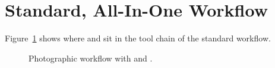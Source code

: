 

\section[Standard Workflow]{Standard, All-In-One Workflow
  \label{sec:standard-workflow}
  }

Figure~\ref{fig:photographic-workflow} shows where
 and  sit in the tool chain
of the standard workflow.

\begin{figure}[htbp]
  \begin{maxipage}
    \centering
  \end{maxipage}

  \caption[Photographic workflow]{Photographic workflow with
     and
    .\label{fig:photographic-workflow}}



\end{figure}

